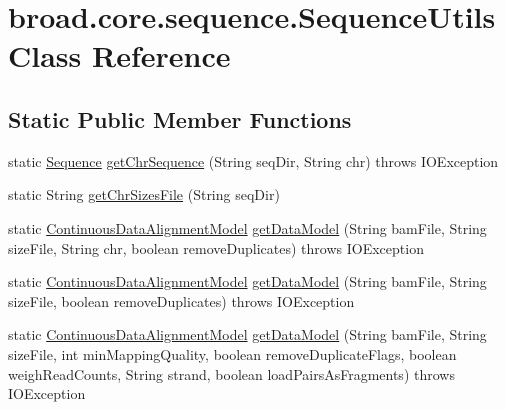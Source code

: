 \hypertarget{classbroad_1_1core_1_1sequence_1_1_sequence_utils}{\section{broad.\+core.\+sequence.\+Sequence\+Utils Class Reference}
\label{classbroad_1_1core_1_1sequence_1_1_sequence_utils}
}
\subsection*{Static Public Member Functions}
\begin{DoxyCompactItemize}
\item 
static \hyperlink{classbroad_1_1core_1_1sequence_1_1_sequence}{Sequence} \hyperlink{classbroad_1_1core_1_1sequence_1_1_sequence_utils_a209552755e74b65ff900a09d25c8387a}{get\+Chr\+Sequence} (String seq\+Dir, String chr)  throws I\+O\+Exception
\item 
static String \hyperlink{classbroad_1_1core_1_1sequence_1_1_sequence_utils_a8e5ce4d144fbbc7b0d274e410cb25921}{get\+Chr\+Sizes\+File} (String seq\+Dir)
\item 
static \hyperlink{classbroad_1_1pda_1_1seq_1_1segmentation_1_1_continuous_data_alignment_model}{Continuous\+Data\+Alignment\+Model} \hyperlink{classbroad_1_1core_1_1sequence_1_1_sequence_utils_aefce66d41ea513ac55e494811f725522}{get\+Data\+Model} (String bam\+File, String size\+File, String chr, boolean remove\+Duplicates)  throws I\+O\+Exception
\item 
static \hyperlink{classbroad_1_1pda_1_1seq_1_1segmentation_1_1_continuous_data_alignment_model}{Continuous\+Data\+Alignment\+Model} \hyperlink{classbroad_1_1core_1_1sequence_1_1_sequence_utils_a8719ab1ad2b5eeee9624dbda3460a86f}{get\+Data\+Model} (String bam\+File, String size\+File, boolean remove\+Duplicates)  throws I\+O\+Exception
\item 
static \hyperlink{classbroad_1_1pda_1_1seq_1_1segmentation_1_1_continuous_data_alignment_model}{Continuous\+Data\+Alignment\+Model} \hyperlink{classbroad_1_1core_1_1sequence_1_1_sequence_utils_af85d1e4bea844f6a0eaea6cced548ea6}{get\+Data\+Model} (String bam\+File, String size\+File, int min\+Mapping\+Quality, boolean remove\+Duplicate\+Flags, boolean weigh\+Read\+Counts, String strand, boolean load\+Pairs\+As\+Fragments)  throws I\+O\+Exception 
\end{DoxyCompactItemize}


